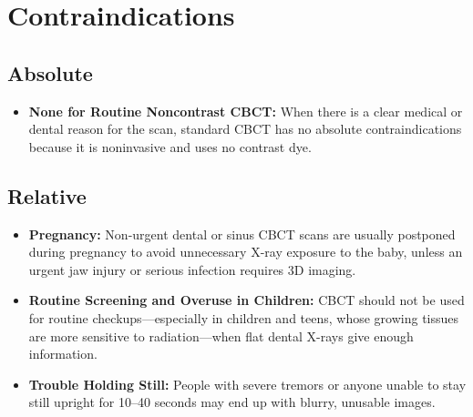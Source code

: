 \section{Contraindications}

\subsection{Absolute}
\begin{itemize}
    \item \textbf{None for Routine Noncontrast CBCT:} When there is a clear medical or dental reason for the scan, standard CBCT has no absolute contraindications because it is noninvasive and uses no contrast dye.
\end{itemize}

\subsection{Relative}
\begin{itemize}
    \item \textbf{Pregnancy:} Non-urgent dental or sinus CBCT scans are usually postponed during pregnancy to avoid unnecessary X-ray exposure to the baby, unless an urgent jaw injury or serious infection requires 3D imaging.
    \item \textbf{Routine Screening and Overuse in Children:} CBCT should not be used for routine checkups---especially in children and teens, whose growing tissues are more sensitive to radiation---when flat dental X-rays give enough information.
    \item \textbf{Trouble Holding Still:} People with severe tremors or anyone unable to stay still upright for 10--40 seconds may end up with blurry, unusable images.
\end{itemize}

